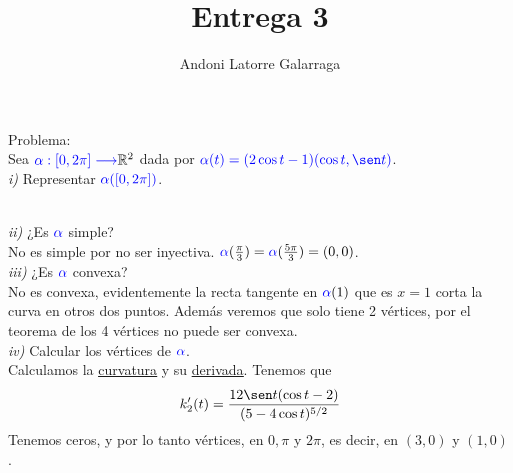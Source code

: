 \documentclass{article}
\title{Entrega 3}
\author{Andoni Latorre Galarraga}
\date{}
\newcommand{\bb}[1]{\mathbb{#1}}
\begin{document}
\maketitle

\textcolor{WildStrawberry}{Problema:}\\
Sea $\textcolor{blue}{\alpha:[0,2\pi] \longrightarrow} \bb{R}^2$ dada por $\textcolor{blue}{\alpha(t)= (2\cos t -1)(\cos t, \sen t)}$.\\
\textit{i)} Representar $\textcolor{blue}{\alpha([0, 2\pi])}$.\\
\\
\textit{ii)} ¿Es $\textcolor{blue}{\alpha}$ simple?\\
No es simple por no ser inyectiva. $\textcolor{blue}{\alpha}(\frac{\pi}{3})=\textcolor{blue}{\alpha}(\frac{5\pi}{3})=(0,0)$.\\
\textit{iii)} ¿Es $\textcolor{blue}{\alpha}$ convexa?\\
No es convexa, evidentemente la recta tangente en $\textcolor{blue}{\alpha}(1)$ que es $x= 1$ corta la curva en otros dos puntos. Además veremos que solo tiene 2 vértices, por el teorema de los 4 vértices no puede ser convexa.\\
\textit{iv)} Calcular los vértices de $\textcolor{blue}{\alpha}$.\\
Calculamos la \href{https://www.wolframalpha.com/input?i=Curvature+of+%28%282cos%28t%29-1%29*cos%28t%29%2C%282cos%28t%29-1%29*sin%28t%29%29}{\textcolor{WildStrawberry}{\underline{curvatura}}} y su \href{https://www.wolframalpha.com/input?i=derivative+%289+-+6+cos%28t%29%29%2F%285+-+4+cos%28t%29%29%5E%283%2F2%29}{\textcolor{WildStrawberry}{\underline{derivada}}}. Tenemos que
$$
k_2'(t)=\frac{12 \sen t(\cos t -2)}{(5- 4 \cos t)^{5/2}}
$$
Tenemos ceros, y por lo tanto vértices, en $0, \pi$ y $2\pi$, es decir, en $(3,0)$ y $(1,0)$.
\end{document}
